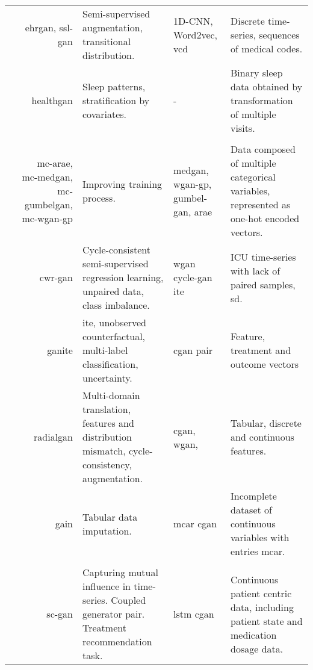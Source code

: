 \begin{center}
\begin{longtable}[l]{@{}p{}Rp{0.25\textwidth}Mp{0.20\textwidth}@{}}
        \citeauthor{Che_2017} & \gls{ehrgan}, \gls{ssl-gan} 
        & Semi-supervised augmentation, transitional distribution. & 1D-CNN, Word2vec, \gls{vcd}
        & Discrete time-series, sequences of medical codes. \\
        
        \citeauthor{Dash} & \gls{healthgan} & Sleep patterns, stratification by covariates. & - & Binary sleep data obtained by transformation of multiple visits.\\
        
        \hline
         & & & \\
        \hline
        
        \citeauthor{Camino2018-re} & \raggedright \gls{mc-arae}, \gls{mc-medgan}, \gls{mc-gumbelgan}, \gls{mc-wgan-gp}
        & Improving training process.  & \gls{medgan}, \gls{wgan-gp}, \gls{gumbel-gan}, \gls{arae}
        & Data composed of multiple categorical variables, represented as one-hot encoded vectors. \\
        
        \citeauthor{mcdermott2018semi} & \gls{cwr-gan}
        & Cycle-consistent semi-supervised regression learning, unpaired data, class imbalance. & \gls{wgan} \gls{cycle-gan} \gls{ite}
        & ICU time-series with lack of paired samples, \gls{sd}. \\
        
        \citeauthor{Yoon2018-ite} & \gls{ganite} 
        & \gls{ite}, unobserved counterfactual, multi-label classification, uncertainty. & \gls{cgan} pair
        & Feature, treatment and outcome vectors\\
        
        \citeauthor{Yoon2018-radial} & \gls{radialgan} 
        & Multi-domain translation, features and distribution mismatch, cycle-consistency, augmentation. & \gls{cgan}, \gls{wgan},
        & Tabular, discrete and continuous features.\\
        
        \citeauthor{yoon2018imputation} & \gls{gain}
        & Tabular data imputation. & \gls{mcar} \gls{cgan}
        & Incomplete dataset of continuous variables with entries \gls{mcar}.\\
        
        \hline
         & & & \\
        \hline
        
        \citeauthor{Wang_2019} & \gls{sc-gan}
        & Capturing mutual influence in time-series. Coupled generator pair. Treatment recommendation task. & \gls{lstm} \gls{cgan}
        & Continuous patient centric data, including patient state and medication dosage data.\\
        

\end{longtable}
\end{center}

